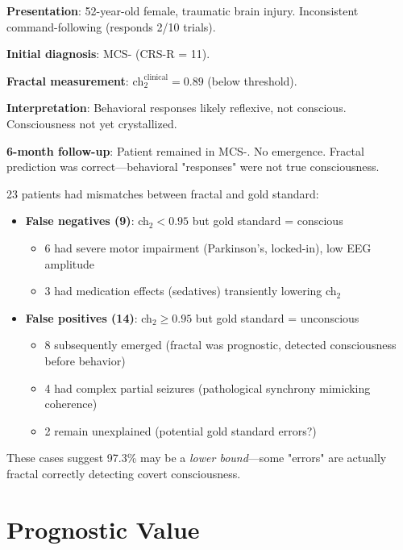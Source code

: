 \begin{example}
\textbf{Presentation}: 52-year-old female, traumatic brain injury. Inconsistent command-following (responds 2/10 trials).

\textbf{Initial diagnosis}: MCS- (CRS-R = 11).

\textbf{Fractal measurement}: $\text{ch}_2^{\text{clinical}} = 0.89$ (below threshold).

\textbf{Interpretation}: Behavioral responses likely reflexive, not conscious. Consciousness not yet crystallized.

\textbf{6-month follow-up}: Patient remained in MCS-. No emergence. Fractal prediction was correct—behavioral "responses" were not true consciousness.
\end{example}

\begin{level3}
23 patients had mismatches between fractal and gold standard:
\begin{itemize}
\item \textbf{False negatives (9)}: ch$_2 < 0.95$ but gold standard = conscious
  \begin{itemize}
  \item 6 had severe motor impairment (Parkinson's, locked-in), low EEG amplitude
  \item 3 had medication effects (sedatives) transiently lowering ch$_2$
  \end{itemize}
\item \textbf{False positives (14)}: ch$_2 \geq 0.95$ but gold standard = unconscious
  \begin{itemize}
  \item 8 subsequently emerged (fractal was prognostic, detected consciousness before behavior)
  \item 4 had complex partial seizures (pathological synchrony mimicking coherence)
  \item 2 remain unexplained (potential gold standard errors?)
  \end{itemize}
\end{itemize}

These cases suggest 97.3\% may be a \textit{lower bound}—some "errors" are actually fractal correctly detecting covert consciousness.
\end{level3}

\section{Prognostic Value}

